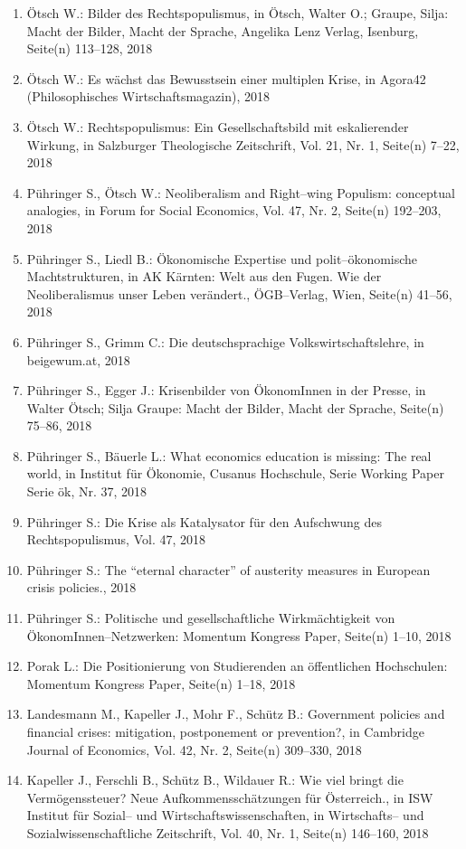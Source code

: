 \begin{enumerate}
	 \item Ötsch W.: Bilder des Rechtspopulismus, in Ötsch, Walter O.; Graupe, Silja: Macht der Bilder, Macht der Sprache, Angelika Lenz Verlag, Isenburg, Seite(n) 113--128, 2018
	 \item Ötsch W.: Es wächst das Bewusstsein einer multiplen Krise, in Agora42 (Philosophisches Wirtschaftsmagazin), 2018
	 \item Ötsch W.: Rechtspopulismus: Ein Gesellschaftsbild mit eskalierender Wirkung, in Salzburger Theologische Zeitschrift, Vol. 21, Nr. 1, Seite(n) 7--22, 2018
	 \item Pühringer S., Ötsch W.: Neoliberalism and Right--wing Populism: conceptual analogies, in Forum for Social Economics, Vol. 47, Nr. 2, Seite(n) 192--203, 2018
	 \item Pühringer S., Liedl B.: Ökonomische Expertise und polit--ökonomische Machtstrukturen, in AK Kärnten: Welt aus den Fugen. Wie der Neoliberalismus unser Leben verändert., ÖGB--Verlag, Wien, Seite(n) 41--56, 2018
	 \item Pühringer S., Grimm C.: Die deutschsprachige Volkswirtschaftslehre, in beigewum.at, 2018
	 \item Pühringer S., Egger J.: Krisenbilder von ÖkonomInnen in der Presse, in Walter Ötsch; Silja Graupe: Macht der Bilder, Macht der Sprache, Seite(n) 75--86, 2018
	 \item Pühringer S., Bäuerle L.: What economics education is missing: The real world, in Institut für Ökonomie, Cusanus Hochschule, Serie Working Paper Serie ök, Nr. 37, 2018
	 \item Pühringer S.: Die Krise als Katalysator für den Aufschwung des Rechtspopulismus, Vol. 47, 2018
	 \item Pühringer S.: The “eternal character” of austerity measures in European crisis policies., 2018
	 \item Pühringer S.: Politische und gesellschaftliche Wirkmächtigkeit von ÖkonomInnen--Netzwerken: Momentum Kongress Paper, Seite(n) 1--10, 2018
	 \item Porak L.: Die Positionierung von Studierenden an öffentlichen Hochschulen: Momentum Kongress Paper, Seite(n) 1--18, 2018
	 \item Landesmann M., Kapeller J., Mohr F., Schütz B.: Government policies and financial crises: mitigation, postponement or prevention?, in Cambridge Journal of Economics, Vol. 42, Nr. 2, Seite(n) 309--330, 2018
	 \item Kapeller J., Ferschli B., Schütz B., Wildauer R.: Wie viel bringt die Vermögenssteuer? Neue Aufkommensschätzungen für Österreich., in ISW Institut für Sozial-- und Wirtschaftswissenschaften, in Wirtschafts-- und Sozialwissenschaftliche Zeitschrift, Vol. 40, Nr. 1, Seite(n) 146--160, 2018

\end{enumerate}
